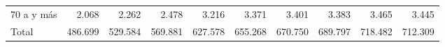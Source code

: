 \begin{tabular}{llllllllll}
\multicolumn{1}{l}{\hspace{1em}70 a y más} &
  \multicolumn{1}{|r}{2.068} &
  \multicolumn{1}{r}{2.262} &
  \multicolumn{1}{r}{2.478} &
  \multicolumn{1}{r}{3.216} &
  \multicolumn{1}{r}{3.371} &
  \multicolumn{1}{r}{3.401} &
  \multicolumn{1}{r}{3.383} &
  \multicolumn{1}{r}{3.465} &
  \multicolumn{1}{r}{3.445} \\
\multicolumn{1}{l}{\hspace{1em}Total} &
  \multicolumn{1}{|r}{486.699} &
  \multicolumn{1}{r}{529.584} &
  \multicolumn{1}{r}{569.881} &
  \multicolumn{1}{r}{627.578} &
  \multicolumn{1}{r}{655.268} &
  \multicolumn{1}{r}{670.750} &
  \multicolumn{1}{r}{689.797} &
  \multicolumn{1}{r}{718.482} &
  \multicolumn{1}{r}{712.309} \\
\cline{1-10}
\end{tabular}
